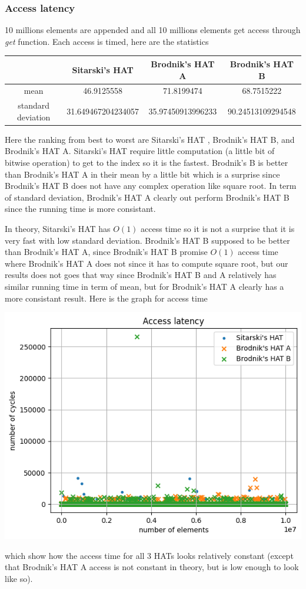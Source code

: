 \documentclass{article} %
\begin{document}
    \subsubsection*{Access latency}
    10 millions elements are appended and all 10 millions elements get access through \emph{get} function.
    Each access is timed, here are the statistics
    \begin{center}
        \begin{tabular}{|c|c|c|c|}\hline
        & Sitarski's HAT & Brodnik's HAT A & Brodnik's HAT B\\\hline
        mean &  46.9125558 & 71.8199474 & 68.7515222\\\hline
        standard deviation & 31.649467204234057  & 35.97450913996233 & 90.24513109294548\\\hline
        \end{tabular}
    \end{center}
    Here the ranking from best to worst are Sitarski's HAT , Brodnik's HAT B, and Brodnik's HAT A. Sitarski's HAT require little
    computation (a little bit of bitwise operation) to get to the index so it is the fastest. Brodnik's B is better than Brodnik's HAT A in
    their mean by a little bit which is a surprise since Brodnik's HAT B does not have any complex operation like square root. In term of standard deviation,
    Brodnik's HAT A clearly out perform Brodnik's HAT B since the running time is more consistant.

    In theory, Sitarski's HAT has $O(1)$ access time so it is not a surprise that it is very fast with low standard deviation.
    Brodnik's HAT B supposed to be better than Brodnik's HAT A, since Brodnik's HAT B promise $O(1)$ access time where
    Brodnik's HAT A does not since it has to compute square root, but our results does not goes that way since Brodnik's HAT B and A
    relatively has similar running time in term of mean, but for Brodnik's HAT A clearly has a more consistant result.
    Here is the graph for access time
    \begin{center}
        \includegraphics{graphics/hat_access.png}
    \end{center}
    which show how the access time for all 3 HATs looks relatively constant (except that Brodnik's HAT A access is not constant in theory, but is low enough to look like so).
\end{document}
